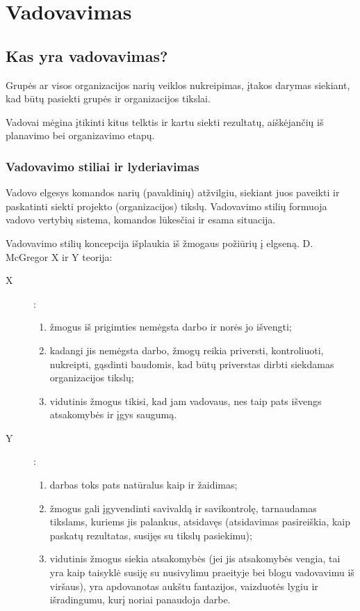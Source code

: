 \chapter{Vadovavimas}

\section{Kas yra vadovavimas?}

\begin{defn}[Vadovavimas]
  Grupės ar visos organizacijos narių veiklos nukreipimas, įtakos
  darymas siekiant, kad būtų pasiekti grupės ir organizacijos tikslai.
\end{defn}

Vadovai mėgina įtikinti kitus telktis ir kartu siekti rezultatų,
aiškėjančių iš planavimo bei organizavimo etapų.

\subsection{Vadovavimo stiliai ir lyderiavimas}

\begin{defn}
  Vadovo elgesys komandos narių (pavaldinių) atžvilgiu, siekiant juos
  paveikti ir paskatinti siekti projekto (organizacijos) tikslų.
  Vadovavimo stilių formuoja vadovo vertybių sistema, komandos lūkesčiai ir
  esama situacija.
\end{defn}

Vadovavimo stilių koncepcija išplaukia iš žmogaus požiūrių į elgseną.
D. McGregor X ir Y teorija:
\begin{description}
  \item[X]:
    \begin{enumerate}
      \item žmogus iš prigimties nemėgsta darbo ir norės jo išvengti;
      \item kadangi jis nemėgsta darbo, žmogų reikia priversti,
        kontroliuoti, nukreipti, gąsdinti baudomis, kad būtų priverstas
        dirbti siekdamas organizacijos tikslų;
      \item vidutinis žmogus tikisi, kad jam vadovaus, nes taip pats
        išvengs atsakomybės ir įgys saugumą.
    \end{enumerate}
  \item[Y]:
    \begin{enumerate}
      \item darbas toks pats natūralus kaip ir žaidimas;
      \item žmogus gali įgyvendinti savivaldą ir savikontrolę,
        tarnaudamas tikslams, kuriems jis palankus, atsidavęs
        (atsidavimas pasireiškia, kaip paskatų rezultatas, susijęs
        su tikslų pasiekimu);
      \item vidutinis žmogus siekia atsakomybės (jei jis atsakomybės
        vengia, tai yra kaip taisyklė susiję su nusivylimu praeityje
        bei blogu vadovavimu iš viršaus), yra apdovanotas aukštu
        fantazijos, vaizduotės lygiu ir išradingumu, kurį noriai
        panaudoja darbe.
    \end{enumerate}
\end{description}

